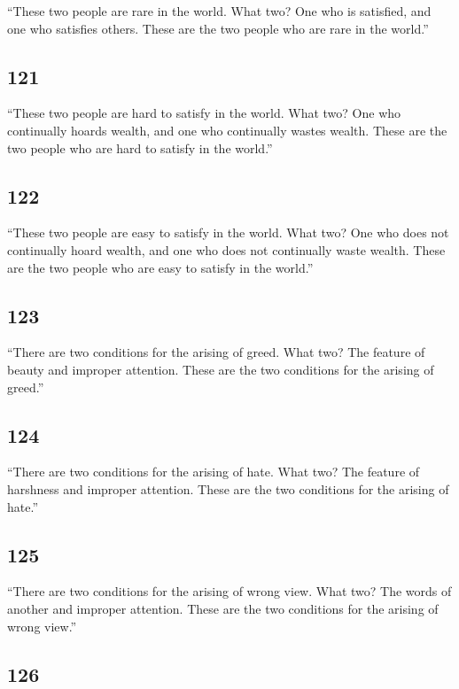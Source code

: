 \documentclass[12pt,openany]{book}%
\begin{document}
“These two people are rare in the world. What two? One who is satisfied, and one who satisfies others. These are the two people who are rare in the world.” 

\subsection*{121 }

“These two people are hard to satisfy in the world. What two? One who continually hoards wealth, and one who continually wastes wealth. These are the two people who are hard to satisfy in the world.” 

\subsection*{122 }

“These two people are easy to satisfy in the world. What two? One who does not continually hoard wealth, and one who does not continually waste wealth. These are the two people who are easy to satisfy in the world.” 

\subsection*{123 }

“There are two conditions for the arising of greed. What two? The feature of beauty and improper attention. These are the two conditions for the arising of greed.” 

\subsection*{124 }

“There are two conditions for the arising of hate. What two? The feature of harshness and improper attention. These are the two conditions for the arising of hate.” 

\subsection*{125 }

“There are two conditions for the arising of wrong view. What two? The words of another and improper attention. These are the two conditions for the arising of wrong view.” 

\subsection*{126 }
\end{document}
